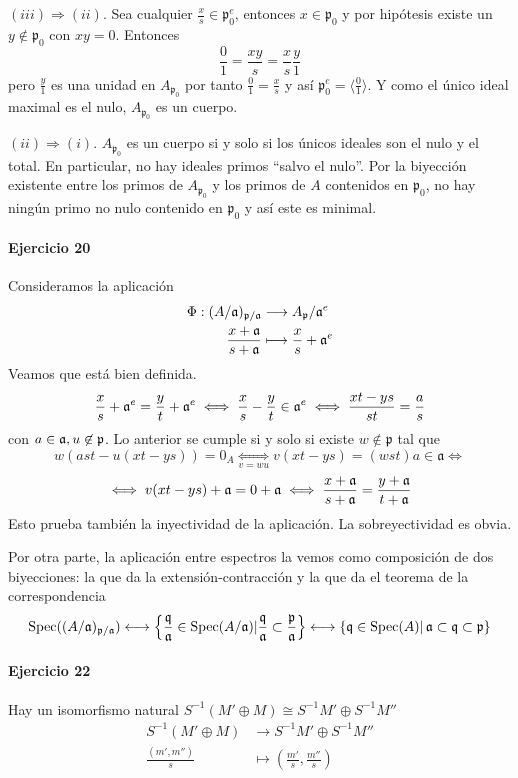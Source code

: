 \documentclass[./ejercicios.tex]{subfiles}
\begin{document}
$(iii)\Rightarrow (ii)$. Sea cualquier $\frac{x}{s}\in \mathfrak{p}_0^e$, entonces $x \in \mathfrak{p}_0$ y por hipótesis existe un $y \not \in \mathfrak{p}_0$ con $xy = 0$. Entonces
$$
\frac{ 0 }{ 1 } = \frac{xy}{s} = \frac{x}{s} \frac{y}{1}
$$
pero $\frac{y}{1}$ es una unidad en $A_{\mathfrak{p}_0}$ por tanto $\frac{0}{1} = \frac{ x }{ s }$ y así $\mathfrak{p}_0^e = \langle \frac{0}{1} \rangle$. Y como el único ideal maximal es el nulo, $A_{\mathfrak{p}_0}$  es un cuerpo.

$(ii)\Rightarrow (i)$. $A_{\mathfrak{p}_0}$  es un cuerpo si y solo si los únicos ideales son el nulo y el total. En particular, no hay ideales primos ``salvo el nulo''. Por la biyección existente entre los primos de  $A_{\mathfrak{p}_0}$  y los primos de $A$ contenidos en $\mathfrak{p}_0$, no hay ningún primo no nulo contenido en $\mathfrak{p}_0$ y así este es minimal.

\paragraph{Ejercicio 20}

Consideramos la aplicación
\begin{align*}
  \Phi: (A/\mathfrak{a})_{\mathfrak{p}/\mathfrak{a}} &\longrightarrow A_\mathfrak{p}/\mathfrak{a}^e\\
  \frac{x+\mathfrak{a}}{s+\mathfrak{a}} &\longmapsto \frac{x}{s}+\mathfrak{a}^e
\end{align*}
Veamos que está bien definida.
$$
\frac{x}{s}+ \mathfrak{a}^e = \frac{y}{t}+\mathfrak{a}^e \iff \frac{x}{s}-  \frac{y}{t}\in \mathfrak{a}^e  \iff \frac{xt-ys}{st} = \frac{a}{s}
$$
con $a\in \mathfrak{a}, u \not \in \mathfrak{p}$. Lo anterior se cumple si y solo si existe $w \not \in \mathfrak{p}$ tal que
$$
w ( ast - u(xt-ys)) = 0_A \underset{v = wu}{\iff}  v(xt-ys) = (wst)a \in \mathfrak{a} \iff$$
$$
\iff v(xt-ys) + \mathfrak{a} = 0+\mathfrak{a}  \iff  \frac{x+\mathfrak{a}}{s+\mathfrak{a}}= \frac{y+\mathfrak{a}}{t+\mathfrak{a}}
$$
Esto prueba también la inyectividad de la aplicación. La sobreyectividad es obvia.

Por otra parte, la aplicación entre espectros la vemos como composición de dos biyecciones: la que da la extensión-contracción y la que da el teorema de la correspondencia
$$
\operatorname{Spec}((A/\mathfrak{a})_{\mathfrak{p}/\mathfrak{a}}) 	\longleftrightarrow \left \{ \frac{\mathfrak{q}}{\mathfrak{a}}\in \operatorname{Spec}(A/\mathfrak{a}) \vert \frac{\mathfrak{q}}{\mathfrak{a}} \subset \frac{\mathfrak{p}}{\mathfrak{a}} \right\} \longleftrightarrow \left  \{ \mathfrak{q} \in \operatorname{Spec}(A) \vert \, \mathfrak{a} \subset \mathfrak{q} \subset \mathfrak{p} \right\}
$$

\paragraph{Ejercicio 22}
Hay un isomorfismo natural $S^{-1}(M'\oplus M) \cong S^{-1}M' \oplus S^{-1}M''$
\begin{align*}
S^{-1}(M'\oplus M) &\longrightarrow S^{-1}M' \oplus S^{-1}M''\\
\frac{(m',m'')}{s} &\longmapsto  \left( \frac{m'}{s}, \frac{m''}{s} \right)
\end{align*}
\end{document}

